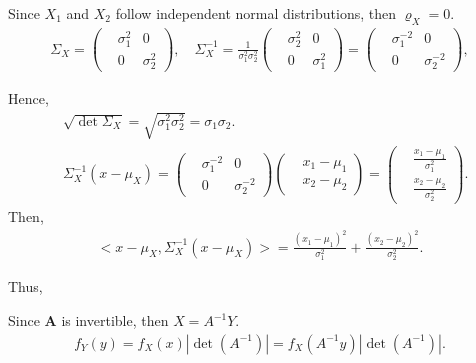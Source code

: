 {\item
Since $X_1$ and $X_2$ follow independent normal distributions, then $\varrho_{X}=0$.
\begin{align*}
    \Sigma_X=\left(\begin{aligned}
        &\sigma_1^2 & 0\\
        &0 & \sigma_2^2
    \end{aligned}\right), \quad
    \Sigma_X^{-1}=\frac{1}{\sigma_1^2\sigma_2^2}\left(\begin{aligned}
        &\sigma_2^2 & 0\\
        &0 & \sigma_1^2
    \end{aligned}\right)=\left(\begin{aligned}
        &\sigma_1^{-2} & 0\\
        &0 & \sigma_2^{-2}
    \end{aligned}\right),
\end{align*}

Hence,
\begin{align*}
    &\sqrt{\det\Sigma_X}=\sqrt{\sigma_1^2\sigma_2^2}=\sigma_1\sigma_2.\\
    &\Sigma_X^{-1}(x-\mu_X)=\left(\begin{aligned}
        &\sigma_1^{-2} & 0\\
        &0 & \sigma_2^{-2}
    \end{aligned}\right)
    \left(\begin{aligned}
        &x_1-\mu_1\\
        &x_2-\mu_2
    \end{aligned}\right)=
    \left(\begin{aligned}
        &\frac{x_1-\mu_1}{\sigma_1^2}\\
        &\frac{x_2-\mu_2}{\sigma_2^2}    
    \end{aligned}\right).
\end{align*}
Then,
\begin{align*}
    \bigg<x-\mu_X,\Sigma_X^{-1}(x-\mu_X)\bigg>=\frac{(x_1-\mu_1)^2}{\sigma_1^2}+\frac{(x_2-\mu_2)^2}{\sigma_2^2}.
\end{align*}

Thus,

\item
Since \textbf{A} is invertible, then $X=A^{-1}Y$.
\begin{align*}
    f_Y(y)=f_X(x)|\det(A^{-1})|=f_X(A^{-1}y)|\det(A^{-1})|.
\end{align*}

}
